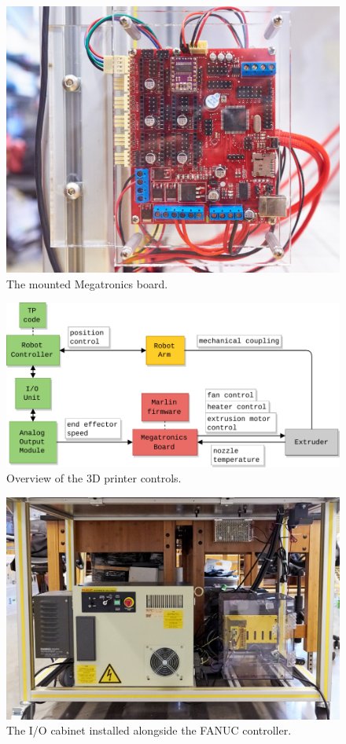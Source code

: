 \begin{figure}[t]
    \centering
    \includegraphics[width=.8\linewidth]{figures/mounted-mega}
    \caption{The mounted Megatronics board.}
    \label{fig:mounted-mega}
\end{figure}

\begin{figure}[t]
    \centering
    \includegraphics[width=.8\linewidth]{figures/diagrams/system overview}
    \caption{Overview of the 3D printer controls.}
    \label{fig:sys-overview}
\end{figure}

\begin{figure}[t]
    \centering
    \includegraphics[width=.8\linewidth]{figures/cabinet2}
    \caption{The I/O cabinet installed alongside the FANUC controller.}
    \label{fig:cabinet-2}
\end{figure}

